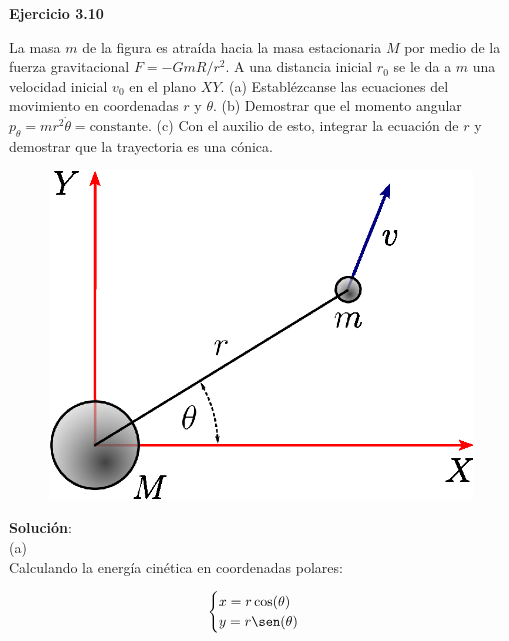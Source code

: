 \documentclass[letter,11pt]{article}
\begin{document}
\begin{center}
    {\large \bf{Ejercicio 3.10}}
\end{center}

\noindent{}

\vspace{1.0cm}

La masa $m$ de la figura es atraída hacia la masa estacionaria $M$ por medio de
la fuerza gravitacional $F=-GmR/r^2$. A una distancia inicial $r_0$ se le da a
$m$ una velocidad inicial $v_0$ en el plano $XY$. (a) Establézcanse las
ecuaciones del movimiento en coordenadas $r$ y $\theta$. (b) Demostrar que el
momento angular $p_{\theta}=mr^2\dot{\theta}=\text{constante}$. (c) Con el
auxilio de esto, integrar la ecuación de $r$ y demostrar que la trayectoria es
una cónica.

\begin{figure}[!h]
\centering
\includegraphics[scale=0.5]{resources/tarea_01.eps}
\end{figure}

\textbf{Solución}: \\

(a) \\

Calculando la energía cinética en coordenadas polares:

\begin{equation*}
    \begin{cases}
        x=r\cos(\theta)\\
        y=r\sen(\theta)
    \end{cases}
\end{equation*}
\end{document}
